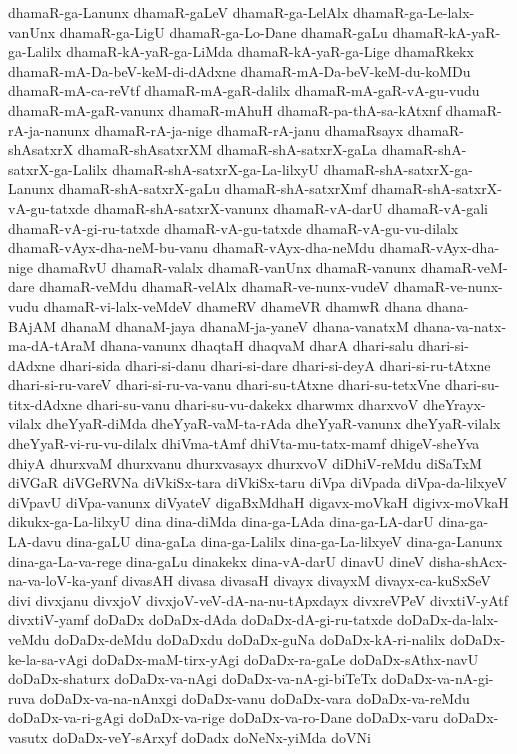 {dhamaR-ga-Lanunx
dhamaR-gaLeV
dhamaR-ga-LelAlx
dhamaR-ga-Le-lalx-vanUnx
dhamaR-ga-LigU
dhamaR-ga-Lo-Dane
dhamaR-gaLu
dhamaR-kA-yaR-ga-Lalilx
dhamaR-kA-yaR-ga-LiMda
dhamaR-kA-yaR-ga-Lige
dhamaRkekx
dhamaR-mA-Da-beV-keM-di-dAdxne
dhamaR-mA-Da-beV-keM-du-koMDu
dhamaR-mA-ca-reVtf
dhamaR-mA-gaR-dalilx
dhamaR-mA-gaR-vA-gu-vudu
dhamaR-mA-gaR-vanunx
dhamaR-mAhuH
dhamaR-pa-thA-sa-kAtxnf
dhamaR-rA-ja-nanunx
dhamaR-rA-ja-nige
dhamaR-rA-janu
dhamaRsayx
dhamaR-shAsatxrX
dhamaR-shAsatxrXM
dhamaR-shA-satxrX-gaLa
dhamaR-shA-satxrX-ga-Lalilx
dhamaR-shA-satxrX-ga-La-lilxyU
dhamaR-shA-satxrX-ga-Lanunx
dhamaR-shA-satxrX-gaLu
dhamaR-shA-satxrXmf
dhamaR-shA-satxrX-vA-gu-tatxde
dhamaR-shA-satxrX-vanunx
dhamaR-vA-darU
dhamaR-vA-gali
dhamaR-vA-gi-ru-tatxde
dhamaR-vA-gu-tatxde
dhamaR-vA-gu-vu-dilalx
dhamaR-vAyx-dha-neM-bu-vanu
dhamaR-vAyx-dha-neMdu
dhamaR-vAyx-dha-nige
dhamaRvU
dhamaR-valalx
dhamaR-vanUnx
dhamaR-vanunx
dhamaR-veM-dare
dhamaR-veMdu
dhamaR-velAlx
dhamaR-ve-nunx-vudeV
dhamaR-ve-nunx-vudu
dhamaR-vi-lalx-veMdeV
dhameRV
dhameVR
dhamwR
dhana
dhana-BAjAM
dhanaM
dhanaM-jaya
dhanaM-ja-yaneV
dhana-vanatxM
dhana-va-natx-ma-dA-tAraM
dhana-vanunx
dhaqtaH
dhaqvaM
dharA
dhari-salu
dhari-si-dAdxne
dhari-sida
dhari-si-danu
dhari-si-dare
dhari-si-deyA
dhari-si-ru-tAtxne
dhari-si-ru-vareV
dhari-si-ru-va-vanu
dhari-su-tAtxne
dhari-su-tetxVne
dhari-su-titx-dAdxne
dhari-su-vanu
dhari-su-vu-dakekx
dharwmx
dharxvoV
dheYrayx-vilalx
dheYyaR-diMda
dheYyaR-vaM-ta-rAda
dheYyaR-vanunx
dheYyaR-vilalx
dheYyaR-vi-ru-vu-dilalx
dhiVma-tAmf
dhiVta-mu-tatx-mamf
dhigeV-sheYva
dhiyA
dhurxvaM
dhurxvanu
dhurxvasayx
dhurxvoV
diDhiV-reMdu
diSaTxM
diVGaR
diVGeRVNa
diVkiSx-tara
diVkiSx-taru
diVpa
diVpada
diVpa-da-lilxyeV
diVpavU
diVpa-vanunx
diVyateV
digaBxMdhaH
digavx-moVkaH
digivx-moVkaH
dikukx-ga-La-lilxyU
dina
dina-diMda
dina-ga-LAda
dina-ga-LA-darU
dina-ga-LA-davu
dina-gaLU
dina-gaLa
dina-ga-Lalilx
dina-ga-La-lilxyeV
dina-ga-Lanunx
dina-ga-La-va-rege
dina-gaLu
dinakekx
dina-vA-darU
dinavU
dineV
disha-shAcx-na-va-loV-ka-yanf
divasAH
divasa
divasaH
divayx
divayxM
divayx-ca-kuSxSeV
divi
divxjanu
divxjoV
divxjoV-veV-dA-na-nu-tApxdayx
divxreVPeV
divxtiV-yAtf
divxtiV-yamf
doDaDx
doDaDx-dAda
doDaDx-dA-gi-ru-tatxde
doDaDx-da-lalx-veMdu
doDaDx-deMdu
doDaDxdu
doDaDx-guNa
doDaDx-kA-ri-nalilx
doDaDx-ke-la-sa-vAgi
doDaDx-maM-tirx-yAgi
doDaDx-ra-gaLe
doDaDx-sAthx-navU
doDaDx-shaturx
doDaDx-va-nAgi
doDaDx-va-nA-gi-biTeTx
doDaDx-va-nA-gi-ruva
doDaDx-va-na-nAnxgi
doDaDx-vanu
doDaDx-vara
doDaDx-va-reMdu
doDaDx-va-ri-gAgi
doDaDx-va-rige
doDaDx-va-ro-Dane
doDaDx-varu
doDaDx-vasutx
doDaDx-veY-sArxyf
doDadx
doNeNx-yiMda
doVNi
}
